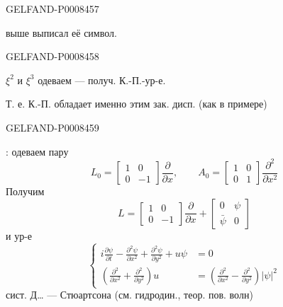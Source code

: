\begin{GelfandAdjacentEvidence}{GELFAND-P000845}{7}


выше выписал её символ.
\end{GelfandAdjacentEvidence}
\begin{GelfandAdjacentEvidence}{GELFAND-P000845}{8}


\(\xi^2\) и \(\xi^3\) одеваем — получ. К.-П.-ур-е.

Т. е. К.-П. обладает именно этим зак. дисп. (как в примере)

\end{GelfandAdjacentEvidence}
\begin{GelfandAdjacentEvidence}{GELFAND-P000845}{9}


: одеваем пару
\[
L_0=\begin{bmatrix}1&0\\0&-1\end{bmatrix}\frac{\partial}{\partial x},
\qquad
A_0=\begin{bmatrix}1&0\\0&1\end{bmatrix}\frac{\partial^2}{\partial x^2}
\]
Получим
\[
L=\begin{bmatrix}1&0\\0&-1\end{bmatrix}\frac{\partial}{\partial x}
+\begin{bmatrix}0&\psi\\\bar\psi&0\end{bmatrix}
\]
и ур-е
\begin{equation*}
\left\{\begin{aligned}
i\frac{\partial\psi}{\partial t}-\frac{\partial^2\psi}{\partial x^2}
+\frac{\partial^2\psi}{\partial y^2}+u\psi&=0\\
\left(\frac{\partial^2}{\partial x^2}+\frac{\partial^2}{\partial y^2}\right)u
&=\left(\frac{\partial^2}{\partial x^2}-\frac{\partial^2}{\partial y^2}\right)|\psi|^2
\end{aligned}\right.
\tag{6}
\end{equation*}
сист. Д… — Стюартсона (см. гидродин., теор. пов. волн)
\end{GelfandAdjacentEvidence}
